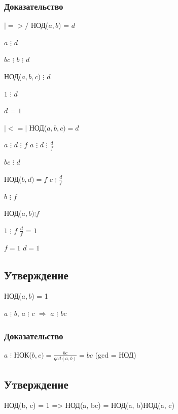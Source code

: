 \documentclass[12pt]{article}
\begin{document}
            \subsubsection{Доказательство}
        $|=>/$ НОД($a, b$) = $d$ \par
        $a$ $\vdots$ $d$ \par
        $bc$ $\vdots$ $b$ $\vdots$ $d$ \par
            НОД($a, b, c$) $\vdots$ $d$ \par
        $1$ $\vdots$ $d$ \par
        $d$ = $1$\par
        $|<=|$ НОД($a, b, c) = d$\par
        $a$ $\vdots$ $d$ $\vdots$ $f$ \qquad  $a$ $\vdots$ $d$ $\vdots$ $\frac{d}{f}$ \par
        $bc$ $\vdots$ $d$ \par
            НОД($b, d) = f$ \qquad  $c$ $\vdots$ $\frac{d}{f}$\par
        $b$ $\vdots$ $f$ \par
            НОД($a, b) \vdots f$ \par
        $1$ $\vdots$ $f$ \qquad $\frac{d}{f}$ = $1$\par
        $f = 1$ \qquad $d = 1$ \par
            \subsection{Утверждение}
            НОД($a, b$) = 1 \par
        $a$ $\vdots$ $b$, $a$ $\vdots$ $c$ $\Rightarrow$ $a$ $\vdots$ $bc$
            \subsubsection{Доказательство}
        $a$ $\vdots$ НОК($b, c) = \frac{bc}{gcd(a, b)} = bc$ (gcd = НОД)
            \subsection{Утверждение}
            НОД(b, c) = 1 => НОД(a, bc) = НОД(a, b)НОД(a, c)
\end{document}
